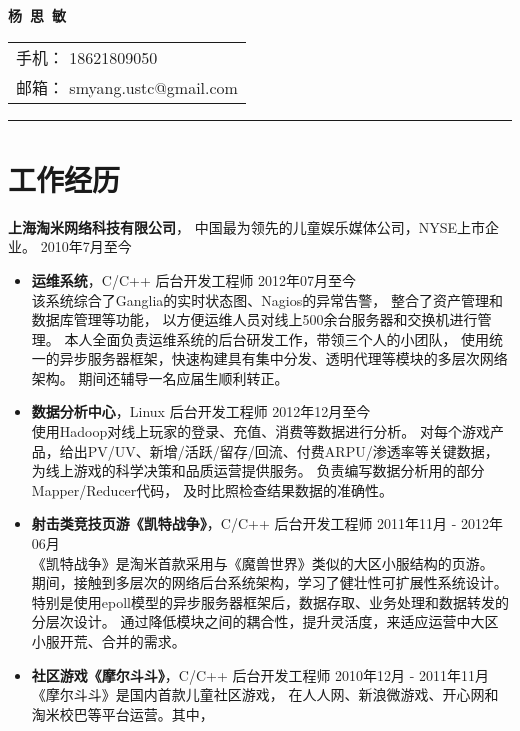 \documentclass[margin]{res}
\newcommand{\taomee}{上海淘米网络科技有限公司}
\begin{document}
{\bfseries \huge 杨\ 思\ 敏}
\hfill
\begin{tabular}{l}
    手机： {18621809050}\\
    邮箱： {smyang.ustc@gmail.com}
\end{tabular}
\rule{\columnwidth}{1pt}


\section{\Large 工作经历}
{\bf \large \taomee}，
中国最为领先的儿童娱乐媒体公司，NYSE上市企业。
\hfill 2010年7月至今\\[1mm]
\begin{itemize}
    \item {\bf 运维系统}，C/C++ 后台开发工程师 
        \hfill 2012年07月至今\\[1mm]
        该系统综合了Ganglia的实时状态图、Nagios的异常告警，
        整合了资产管理和数据库管理等功能，
        以方便运维人员对线上500余台服务器和交换机进行管理。
        本人全面负责运维系统的后台研发工作，带领三个人的小团队，
        使用统一的异步服务器框架，快速构建具有集中分发、透明代理等模块的多层次网络架构。
        期间还辅导一名应届生顺利转正。
        \\
    \item {\bf 数据分析中心}，Linux 后台开发工程师
        \hfill 2012年12月至今\\[1mm]
        使用Hadoop对线上玩家的登录、充值、消费等数据进行分析。
        对每个游戏产品，给出PV/UV、新增/活跃/留存/回流、付费ARPU/渗透率等关键数据，
        为线上游戏的科学决策和品质运营提供服务。
        负责编写数据分析用的部分Mapper/Reducer代码，
        及时比照检查结果数据的准确性。
        \\
    \item {\bf 射击类竞技页游《凯特战争》}，C/C++ 后台开发工程师 
        \hfill 2011年11月 - 2012年06月\\[1mm]
        《凯特战争》是淘米首款采用与《魔兽世界》类似的大区小服结构的页游。
        期间，接触到多层次的网络后台系统架构，学习了健壮性可扩展性系统设计。
        特别是使用epoll模型的异步服务器框架后，数据存取、业务处理和数据转发的分层次设计。
        通过降低模块之间的耦合性，提升灵活度，来适应运营中大区小服开荒、合并的需求。
        \\
    \item {\bf 社区游戏《摩尔斗斗》}，C/C++ 后台开发工程师 
    \hfill 2010年12月 - 2011年11月\\[1mm]
        《摩尔斗斗》是国内首款儿童社区游戏，
        在人人网、新浪微游戏、开心网和淘米校巴等平台运营。其中，

\end{itemize}
\end{document}
